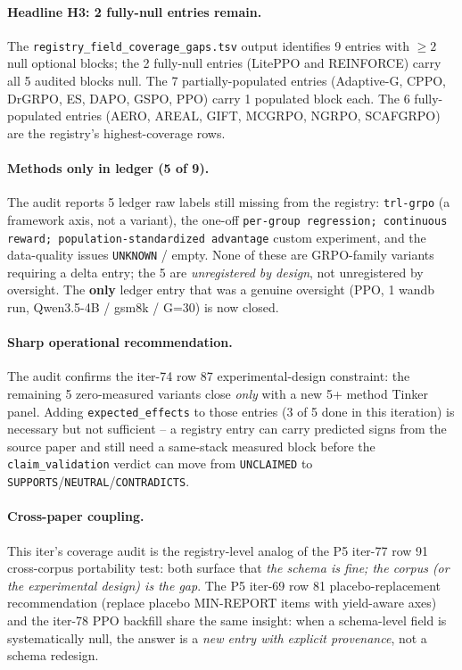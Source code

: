 \paragraph{Headline H3: 2 fully-null entries remain.}
The \texttt{registry\_field\_coverage\_gaps.tsv} output identifies
9 entries with $\geq 2$ null optional blocks; the 2 fully-null entries
(LitePPO and REINFORCE) carry all 5 audited blocks null. The 7
partially-populated entries (Adaptive-G, CPPO, DrGRPO, ES, DAPO,
GSPO, PPO) carry 1 populated block each. The 6 fully-populated
entries (AERO, AREAL, GIFT, MCGRPO, NGRPO, SCAFGRPO) are the
registry's highest-coverage rows.

\paragraph{Methods only in ledger (5 of 9).}
The audit reports 5 ledger raw labels still missing from the registry:
\texttt{trl-grpo} (a framework axis, not a variant), the one-off
\texttt{per-group regression; continuous reward;
population-standardized advantage} custom experiment, and the
data-quality issues \texttt{UNKNOWN} / empty. None of these are
GRPO-family variants requiring a delta entry; the 5 are
\emph{unregistered by design}, not unregistered by oversight. The
\textbf{only} ledger entry that was a genuine oversight (PPO, 1
wandb run, Qwen3.5-4B / gsm8k / G=30) is now closed.

\paragraph{Sharp operational recommendation.}
The audit confirms the iter-74 row 87 experimental-design
constraint: the remaining 5 zero-measured variants close \emph{only}
with a new 5+ method Tinker panel. Adding \texttt{expected\_effects}
to those entries (3 of 5 done in this iteration) is necessary but not
sufficient -- a registry entry can carry predicted signs from the
source paper and still need a same-stack measured block before the
\texttt{claim\_validation} verdict can move from \texttt{UNCLAIMED}
to \texttt{SUPPORTS}/\texttt{NEUTRAL}/\texttt{CONTRADICTS}.

\paragraph{Cross-paper coupling.}
This iter's coverage audit is the registry-level analog of the
P5 iter-77 row 91 cross-corpus portability test: both surface that
\emph{the schema is fine; the corpus (or the experimental design)
is the gap}. The P5 iter-69 row 81 placebo-replacement
recommendation (replace placebo MIN-REPORT items with yield-aware
axes) and the iter-78 PPO backfill share the same insight: when a
schema-level field is systematically null, the answer is a
\emph{new entry with explicit provenance}, not a schema redesign.

